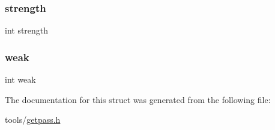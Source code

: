 \subsubsection{\texorpdfstring{strength}{strength}}
{\footnotesize\ttfamily int strength}

\mbox{\label{struct__getpassx_aaa1d7b9bbcc089f15892f72f2526175e}} 
\subsubsection{\texorpdfstring{weak}{weak}}
{\footnotesize\ttfamily int weak}



The documentation for this struct was generated from the following file\+:\begin{DoxyCompactItemize}
\item 
tools/\hyperlink{getpass_8h}{getpass.\+h}\end{DoxyCompactItemize}

